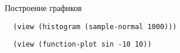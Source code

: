 Построение графиков

\begin{verbatim}
  (view (histogram (sample-normal 1000)))
\end{verbatim}


\begin{verbatim}
  (view (function-plot sin -10 10))
\end{verbatim}



